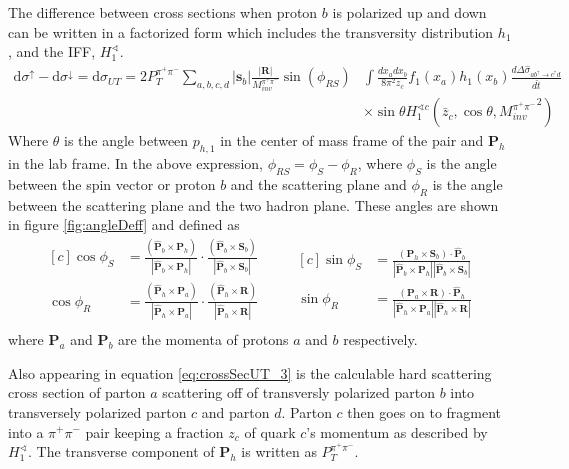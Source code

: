 \documentclass[abstract = on,listof=totoc, bibliography=totoc]{scrreprt}
\newcommand{\phir}{\phi_{R}}
\newcommand{\phis}{\phi_{S}}
\newcommand{\phirs}{\phi_{RS}}
\newcommand{\ptpair}{P_{T}^{\pi^+\pi^-}}
\newcommand{\mpair}{M_{inv}^{\pi^+\pi^-}}
\newcommand{\pip}{\pi^+}
\newcommand{\pim}{\pi^-}
\newcommand{\pair}{$\pip\pim$ }
\begin{document}
The difference between cross sections when proton $b$ is polarized up and down can be written in a factorized form which includes the transversity distribution $h_1$, and the IFF, $H_1^{\sphericalangle}$.
\begin{align}
\label{eq:crossSecUT_3}
\text{d}\sigma^\uparrow - \text{d}\sigma^\downarrow = \text{d}\sigma_{UT} = 2\ptpair \sum_{a,b,c,d} |\boldsymbol{s}_b| \frac{|\boldsymbol{R}|}{\mpair}\sin(\phirs) & \int \frac{dx_a dx_b}{8\pi^2 z_c} f_1(x_a) h_1(x_b) \frac{d\Delta\hat{\sigma}_{a b^\uparrow \rightarrow c^\uparrow d}}{d\hat{t}} \nonumber \\ 
&\times \sin\theta H_1^{\sphericalangle c} \left(\bar{z}_c,\cos\theta, {\mpair}^2\right) 
\end{align}
Where $\theta$ is the angle between $p_{h,1}$ in the center of mass frame of the pair and $\bm{P}_h$ in the lab frame. In the above expression, $\phirs = \phis-\phir$, where $\phis$ is the angle between the spin vector or proton $b$ and the scattering plane and $\phir$ is the angle between the scattering plane and the two hadron plane. These angles are shown in figure \ref{fig:angleDeff} and defined as\cite{bacchettaRadici2}
\begin{equation}
\label{eq:angles}
\begin{aligned}[c]
\cos\phi_S &= \frac{(\bm{\hat{P}}_b \times \bm{P}_h)}{|\bm{\hat{P}}_b \times \bm{P}_h|} \cdot \frac{(\bm{\hat{P}}_b \times \bm{S}_b)}{|\bm{\hat{P}}_b \times \bm{S}_b|} \\
\cos\phi_R &= \frac{(\bm{\hat{P}}_h \times \bm{P}_a)}{|\bm{\hat{P}}_h \times \bm{P}_a|} \cdot \frac{(\bm{\hat{P}}_h \times \bm{R})}{|\bm{\hat{P}}_h \times \bm{R}|} \\
\end{aligned}
\qquad
\begin{aligned}[c]
\sin\phi_S &= \frac{(\bm{P}_h \times \bm{S}_b) \cdot \bm{\hat{P}}_b}{|\bm{\hat{P}}_b \times \bm{P}_h| |\bm{\hat{P}}_b \times \bm{S}_b|} \\
\sin\phi_R &= \frac{(\bm{P}_a \times \bm{R}) \cdot \bm{\hat{P}}_h}{|\bm{\hat{P}}_h \times \bm{P}_a| |\bm{\hat{P}}_h \times \bm{R}|} 
\end{aligned}
\end{equation}
where $\bm{P}_a$ and $\bm{P}_b$ are the momenta of protons $a$ and $b$ respectively.

Also appearing in equation \ref{eq:crossSecUT_3} is the calculable hard scattering cross section of parton $a$ scattering off of transversly polarized parton $b$ into transversely polarized parton $c$ and parton $d$. Parton $c$ then goes on to fragment into a \pair pair keeping a fraction $z_c$ of quark $c$'s momentum as described by $H_1^{\sphericalangle}$. The transverse component of $\bm{P}_h$ is written as $\ptpair$. 
\end{document}
